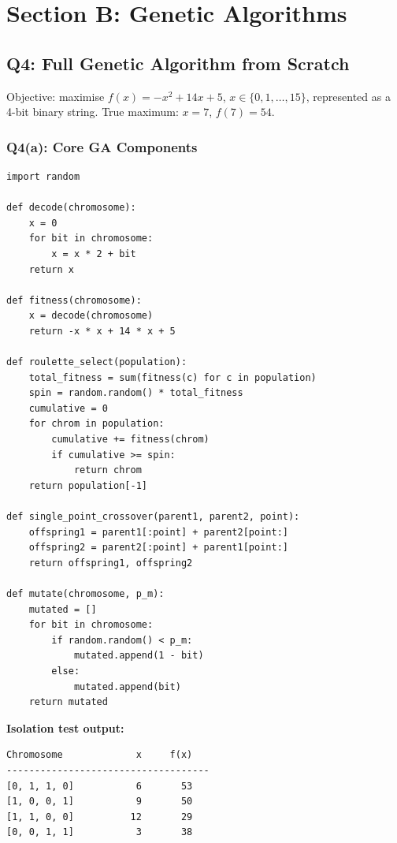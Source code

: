 \documentclass[12pt,a4paper]{article}
\begin{document}
\section{Section B: Genetic Algorithms}

\subsection{Q4: Full Genetic Algorithm from Scratch}

Objective: maximise $f(x) = -x^2 + 14x + 5$, $x \in \{0,1,\ldots,15\}$,
represented as a 4-bit binary string. True maximum: $x=7$, $f(7)=54$.

\subsubsection*{Q4(a): Core GA Components}

\begin{lstlisting}[style=pycode, caption={Q4(a): Core GA functions}]
import random

def decode(chromosome):
    x = 0
    for bit in chromosome:
        x = x * 2 + bit
    return x

def fitness(chromosome):
    x = decode(chromosome)
    return -x * x + 14 * x + 5

def roulette_select(population):
    total_fitness = sum(fitness(c) for c in population)
    spin = random.random() * total_fitness
    cumulative = 0
    for chrom in population:
        cumulative += fitness(chrom)
        if cumulative >= spin:
            return chrom
    return population[-1]

def single_point_crossover(parent1, parent2, point):
    offspring1 = parent1[:point] + parent2[point:]
    offspring2 = parent2[:point] + parent1[point:]
    return offspring1, offspring2

def mutate(chromosome, p_m):
    mutated = []
    for bit in chromosome:
        if random.random() < p_m:
            mutated.append(1 - bit)
        else:
            mutated.append(bit)
    return mutated
\end{lstlisting}

\textbf{Isolation test output:}

\begin{lstlisting}[style=output]
Chromosome             x     f(x)
------------------------------------
[0, 1, 1, 0]           6       53
[1, 0, 0, 1]           9       50
[1, 1, 0, 0]          12       29
[0, 0, 1, 1]           3       38
\end{lstlisting}
\end{document}
